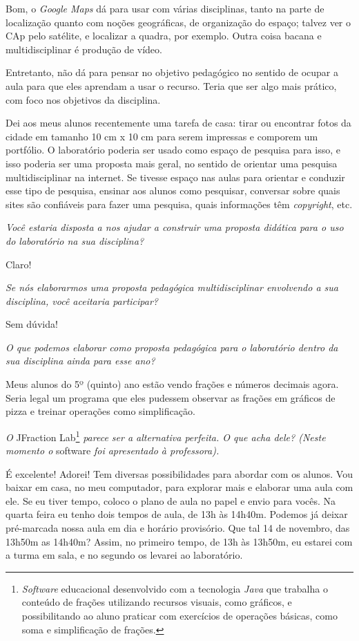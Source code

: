 Bom, o \textit{Google Maps} dá para usar com várias disciplinas, tanto na parte de localização quanto com noções geográficas, de organização do espaço; talvez ver o CAp pelo satélite, e localizar a quadra, por exemplo. Outra coisa bacana e multidisciplinar é produção de vídeo.

Entretanto, não dá para pensar no objetivo pedagógico no sentido de ocupar a aula para que eles aprendam a usar o recurso. Teria que ser algo mais prático, com foco nos objetivos da disciplina.

Dei aos meus alunos recentemente uma tarefa de casa: tirar ou encontrar fotos da cidade em tamanho 10 cm x 10 cm para serem impressas e comporem um portfólio. O laboratório poderia ser usado como espaço de pesquisa para isso, e isso poderia ser uma proposta mais geral, no sentido de orientar uma pesquisa multidisciplinar na internet. Se tivesse espaço nas aulas para orientar e conduzir esse tipo de pesquisa, ensinar aos alunos como pesquisar, conversar sobre quais sites são confiáveis para fazer uma pesquisa, quais informações têm \textit{copyright}, etc.

\textit{Você estaria disposta a nos ajudar a construir uma proposta didática para o uso do laboratório na sua disciplina?}

Claro!

\textit{Se nós elaborarmos uma proposta pedagógica multidisciplinar envolvendo a sua disciplina, você aceitaria participar?}

Sem dúvida!

\textit{O que podemos elaborar como proposta pedagógica para o laboratório dentro da sua disciplina ainda para esse ano?}

Meus alunos do 5º (quinto) ano estão vendo frações e números decimais agora. Seria legal um programa que eles pudessem observar as frações em gráficos de pizza e treinar operações como simplificação.

\textit{O} JFraction Lab\footnote{\textit{Software} educacional desenvolvido com a tecnologia \textit{Java} que trabalha o conteúdo de frações utilizando recursos visuais, como gráficos, e possibilitando ao aluno praticar com exercícios de operações básicas, como soma e simplificação de frações.} \textit{parece ser a alternativa perfeita. O que acha dele? (Neste momento o} software \textit{foi apresentado à professora).}

É excelente! Adorei! Tem diversas possibilidades para abordar com os alunos. Vou baixar em casa, no meu computador, para explorar mais e elaborar uma aula com ele. Se eu tiver tempo, coloco o plano de aula no papel e envio para vocês. Na quarta feira eu tenho dois tempos de aula, de 13h às 14h40m. Podemos já deixar pré-marcada nossa aula em dia e horário provisório. Que tal 14 de novembro, das 13h50m as 14h40m? Assim, no primeiro tempo, de 13h às 13h50m, eu estarei com a turma em sala, e no segundo os levarei ao laboratório.

